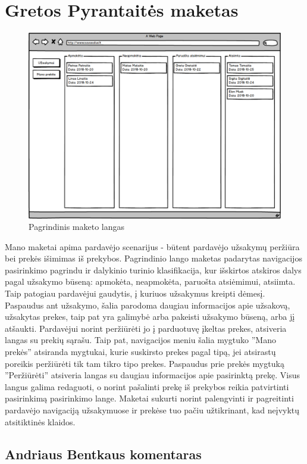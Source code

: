 \documentclass[oneside]{VUMIFPSkursinis}
\begin{document}
\section{Gretos Pyrantaitės maketas}
\begin{figure}
  		\includegraphics[width=\linewidth]{Mano_uzsakymai.png}
  		\caption{Pagrindinis maketo langas}
 		 \label{fig:mak2}
	\end{figure}
Mano maketai apima pardavėjo scenarijus -  būtent pardavėjo užsakymų peržiūra bei prekės išimimas iš prekybos.
Pagrindinio lango maketas padarytas navigacijos pasirinkimo pagrindu ir dalykinio turinio klasifikacija, kur išskirtos atskiros dalys pagal užsakymo būseną: apmokėta, neapmokėta, paruošta atsiėmimui, atsiimta. 
Taip patogiau pardavėjui gaudytis, į kuriuos užsakymus kreipti dėmesį.
Paspaudus ant užsakymo, šalia parodoma daugiau informacijos apie užsakovą, užsakytas prekes, taip pat yra galimybė arba pakeisti užsakymo būseną, arba jį atšaukti.
Pardavėjui norint peržiūrėti jo į parduotuvę įkeltas prekes, atsiveria langas su prekių sąrašu.
Taip pat, navigacijos meniu šalia mygtuko ''Mano prekės'' atsiranda mygtukai, kurie suskirsto prekes pagal tipą, jei atsirastų poreikis peržiūrėti tik tam tikro tipo prekes.
Paspaudus prie prekės mygtuką ''Peržiūrėti'' atsiveria langas su daugiau informacijos apie pasirinktą prekę.
Visus langus galima redaguoti, o norint pašalinti prekę iš prekybos reikia patvirtinti pasirinkimą pasirinkimo lange.
Maketai sukurti norint palengvinti ir pagreitinti pardavėjo navigaciją užsakymuose ir prekėse tuo pačiu užtikrinant, kad neįvyktų atsitiktinės klaidos.

	
	\subsection{Andriaus Bentkaus komentaras}
\end{document}
